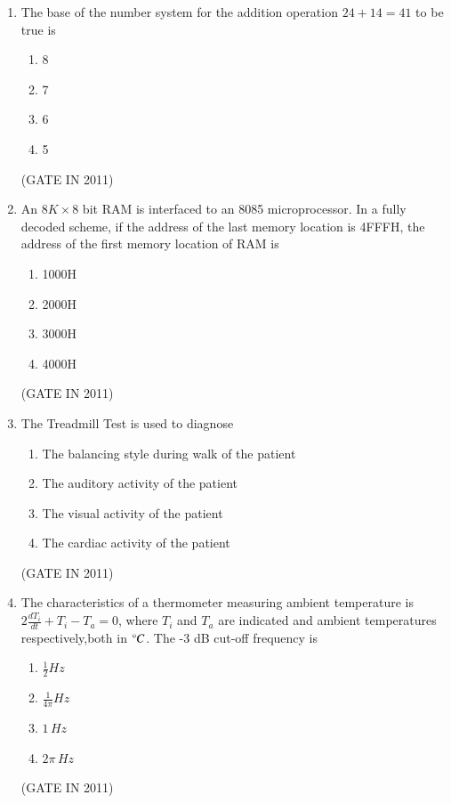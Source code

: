 \documentclass[journal]{IEEEtran}
\begin{document}
\begin{enumerate}
\item The base of the number system for the addition operation $ 24 + 14 = 41 $ to be true is
\begin{multicols}{4}
\begin{enumerate}
\item 8  
\item 7  
\item 6  
\item 5
\end{enumerate}
\end{multicols} \hfill(GATE IN 2011)

\item An $8K \times 8$ bit RAM is interfaced to an 8085 microprocessor. In a fully decoded scheme, if the address of the last memory location is 4FFFH, the address of the first memory location of RAM is
\begin{multicols}{4}
\begin{enumerate}
\item 1000H  
\item 2000H  
\item 3000H  
\item 4000H
\end{enumerate}
\end{multicols} \hfill(GATE IN 2011)
\item The Treadmill Test is used to diagnose
\begin{enumerate}
\item The balancing style during walk of the patient  
\item The auditory activity of the patient  
\item The visual activity of the patient  
\item The cardiac activity of the patient
\end{enumerate}
\hfill(GATE IN 2011)
\item The characteristics of a thermometer measuring ambient temperature is $ 2\frac{dT_i}{dt} + T_i - T_a = 0 $, where $ T_i $ and $ T_a $ are indicated and ambient temperatures respectively,both in $\degree C$. The -3 dB cut-off frequency is
\begin{multicols}{4}
\begin{enumerate}
\item $\frac{1}{2}Hz$  
\item $ \frac{1}{4\pi}Hz $  
\item $1\,Hz$  
\item $2\pi\,Hz$
\end{enumerate}
\end{multicols} \hfill(GATE IN 2011)


\end{enumerate}
\end{document}
